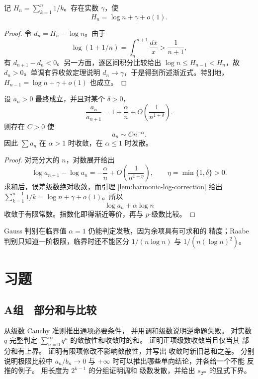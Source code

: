 \begin{lemma}[调和和的对数修正]
\label{lem:harmonic-log-correction}
记 \(H_n=\sum_{k=1}^n1/k\)。存在实数 \(\gamma\)，使
\[
 H_n=\log n+\gamma+o(1).
\]
\end{lemma}

\begin{proof}
令 \(d_n=H_n-\log n\)。由于
\[
 \log(1+1/n)=\int_n^{n+1}\frac{dx}{x}>\frac1{n+1},
\]
有 \(d_{n+1}-d_n<0\)。另一方面，逐区间积分比较给出
\(\log n\le H_{n-1}<H_n\)，故 \(d_n>0\)。单调有界收敛定理说明
\(d_n\to\gamma\)，于是得到所述渐近式。特别地，
\(H_{n-1}=\log n+\gamma+o(1)\) 也成立。
\end{proof}

\begin{theorem}[Gauss 判别]
\label{thm:gauss-test}
设 \(a_n>0\) 最终成立，并且对某个 \(\delta>0\)，
\[
 \frac{a_n}{a_{n+1}}
 =1+\frac{\alpha}{n}
  +O\!\left(\frac1{n^{1+\delta}}\right).
\]
则存在 \(C>0\) 使
\[
 a_n\sim Cn^{-\alpha}.
\]
因此 \(\sum a_n\) 在 \(\alpha>1\) 时收敛，在
\(\alpha\le1\) 时发散。
\end{theorem}

\begin{proof}
对充分大的 \(n\)，对数展开给出
\[
 \log a_{n+1}-\log a_n
 =-\frac{\alpha}{n}
  +O\!\left(\frac1{n^{1+\eta}}\right),
\qquad \eta=\min\{1,\delta\}>0.
\]
求和后，误差级数绝对收敛，而引理 \ref{lem:harmonic-log-correction} 给出
\(\sum_{k=1}^{n-1}1/k=\log n+\gamma+o(1)\)。所以
\[
 \log a_n+\alpha\log n
\]
收敛于有限常数。指数化即得渐近等价，再与 \(p\)-级数比较。
\end{proof}

Gauss 判别在临界值 \(\alpha=1\) 仍能判定发散，因为余项具有可求和的
精度；Raabe 判别只知道一阶极限，临界时还不能区分
\(1/(n\log n)\) 与 \(1/(n(\log n)^2)\)。

\section*{习题}

\subsection*{A组　部分和与比较}
\begin{enumerate}[label=\textbf{\thechapter.\arabic*.}]
  从级数 Cauchy 准则推出通项必要条件，
 并用调和级数说明逆命题失败。
  对实数 \(q\) 完整判定
 \(\sum_{n=0}^\infty q^n\) 的敛散性和收敛时的和。
  证明正项级数收敛当且仅当其
 部分和有上界。
  证明有限项修改不影响敛散性，并写出
 收敛时新旧总和之差。
  分别说明极限比较中
 \(a_n/b_n\to0\) 与 \(+\infty\) 时可以推出哪些单向结论，并各给一个不能
 反推的例子。
  用长度为 \(2^{k-1}\) 的分组证明调和
 级数发散，并给出 \(s_{2^m}\) 的显式下界。
\end{enumerate}

